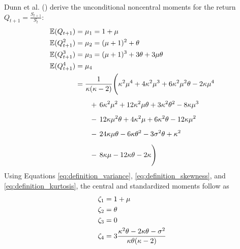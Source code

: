 Dunn et al. (\citeyear{dunnEstimatingOptionPrices2014}) derive the unconditional noncentral moments for the return $Q_{t+1}=\frac{S_{t+1}}{S_t}$:
\begin{align}
    \mathbb{E}(Q_{t+1}) &= \mu_1 = 1+\mu  \notag \\
    \mathbb{E}(Q_{t+1}^2) &= \mu_2 = (\mu+1)^2+\theta \notag \\
    \mathbb{E}(Q_{t+1}^3) &= \mu_3 = (\mu+1)^3+3\theta+3\mu\theta \notag \\
    \mathbb{E}(Q_{t+1}^4) &= \mu_4 \notag \\
    &=\frac{1}{\kappa(\kappa-2)}\Biggl(
        \kappa^2\mu^4 + 4\kappa^2\mu^3 + 6\kappa^2\mu^2\theta - 2\kappa\mu^4 \notag\\[1ex]
    &\quad\quad +\, 6\kappa^2\mu^2 + 12\kappa^2\mu\theta + 3\kappa^2\theta^2 - 8\kappa\mu^3 \notag\\[1ex]
    &\quad\quad -\, 12\kappa\mu^2\theta + 4\kappa^2\mu + 6\kappa^2\theta - 12\kappa\mu^2 \notag\\[1ex]
    &\quad\quad -\, 24\kappa\mu\theta - 6\kappa\theta^2 - 3\sigma^2\theta + \kappa^2 \notag\\[1ex]
    &\quad\quad -\, 8\kappa\mu - 12\kappa\theta - 2\kappa
    \Biggr) \notag
\end{align}
Using Equations \eqref{eq:definition_variance}, \eqref{eq:definition_skewness}, and \eqref{eq:definition_kurtosis}, the central and standardized moments follow as
\begin{align}
    \zeta_1 &= 1+\mu \notag \\
    \zeta_2 &= \theta \notag \\
    \zeta_3 &= 0 \notag \\
    \zeta_4 &= 3\frac{\kappa^2\theta - 2\kappa\theta - \sigma^2}{\kappa\theta(\kappa-2)} \notag
\end{align}